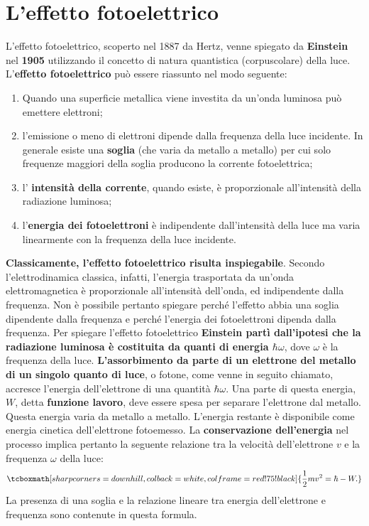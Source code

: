 \section{L'effetto fotoelettrico}
L'effetto fotoelettrico, scoperto nel 1887 da Hertz, venne spiegato da \textbf{Einstein} nel \textbf{1905} utilizzando il concetto di natura quantistica (corpuscolare) della luce.\\
L'\textbf{effetto fotoelettrico} può essere riassunto nel modo seguente:
\begin{enumerate}
\item Quando una superficie metallica viene investita da un'onda luminosa può emettere elettroni;
\item  l'emissione o meno di elettroni dipende dalla frequenza della luce incidente. In generale esiste una \textbf{soglia} (che varia da metallo a metallo) per cui solo frequenze maggiori della soglia producono la corrente fotoelettrica;
\item l' \textbf{intensità della corrente}, quando esiste, è proporzionale all'intensità della radiazione luminosa;
\item l'\textbf{energia dei fotoelettroni} è indipendente dall'intensità della luce ma varia linearmente con la frequenza della luce incidente.
\end{enumerate} 
\textbf{Classicamente, l'effetto fotoelettrico risulta inspiegabile}. Secondo l'elettrodinamica classica, infatti, l'energia trasportata da un'onda elettromagnetica è proporzionale all'intensità dell'onda, ed indipendente dalla frequenza. Non è possibile pertanto spiegare perché l'effetto abbia una soglia dipendente dalla frequenza e perché l'energia dei fotoelettroni dipenda dalla frequenza. Per spiegare l'effetto fotoelettrico \textbf{Einstein partì dall'ipotesi che la radiazione luminosa è costituita da quanti di energia $\hbar \omega$}, dove $\omega$ è la frequenza della luce. \textbf{L'assorbimento da parte di un elettrone del metallo di un singolo quanto di luce}, o fotone, come venne in seguito chiamato, accresce l'energia dell'elettrone di una quantità $\hbar \omega$. Una parte di questa energia, $W$, detta \textbf{funzione lavoro}, deve essere spesa per separare l'elettrone dal metallo. Questa energia varia da metallo a metallo. L'energia restante è disponibile come energia cinetica dell'elettrone fotoemesso. La \textbf{conservazione dell'energia} nel processo implica pertanto la seguente relazione tra la velocità dell'elettrone $v$ e la frequenza $\omega$ della luce:
	\begin{equation}
		\tcboxmath[sharp corners=downhill ,colback=white,colframe=red!75!black]{
			\frac{1}{2}m v^2= \hbar - W.
			}
	\end{equation}
La presenza di una soglia e la relazione lineare tra energia dell'elettrone e frequenza sono contenute in questa formula.\\

